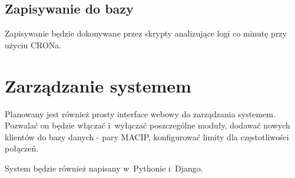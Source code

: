 \documentclass[a4paper,10pt]{article}
\begin{document}
	\subsection{Zapisywanie do bazy}
		Zapisywanie będzie dokonywane przez skrypty analizujące logi co minutę przy użyciu CRONa. 
\section{Zarządzanie systemem}
	Planowany jest również prosty interface webowy do zarządzania systemem. Pozwalać on będzie włączać i~wyłączać poszczególne moduły, dodawać nowych klientów do bazy danych - pary MAC\dywiz IP, konfigurować limity dla częstotliwości połączeń.
	
	System będzie również napisany w~Pythonie i~Django.
\end{document}

